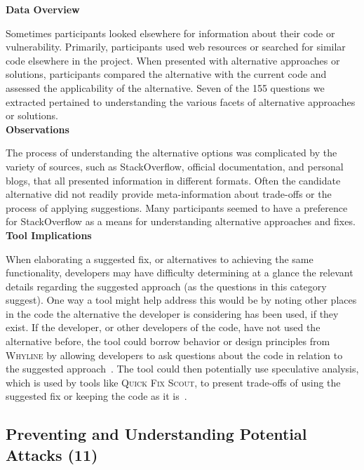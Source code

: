 \documentclass[conference]{IEEEtran}
\begin{document}
\noindent\textbf{Data Overview}

Sometimes participants looked elsewhere for information about their code or vulnerability. 
Primarily, participants used web resources or searched for similar code elsewhere in the project.
When presented with alternative approaches or solutions, participants compared the alternative with the current code and assessed the applicability of the alternative. 
Seven of the 155 questions we extracted pertained to understanding the various facets of alternative approaches or solutions.
\\

\noindent\textbf{Observations}

The process of understanding the alternative options was complicated by the variety of sources, such as StackOverflow, official documentation, and personal blogs, that all presented information in different formats.  
Often the candidate alternative did not readily provide meta-information about trade-offs or the process of applying suggestions. 
Many participants seemed to have a preference for StackOverflow as a means for understanding alternative approaches and fixes. 
\\

\noindent\textbf{Tool Implications}

When elaborating a suggested fix, or alternatives to achieving the same functionality, developers may have difficulty determining at a glance the relevant details regarding the suggested approach (as the questions in this category suggest).
One way a tool might help address this would be by noting other places in the code the alternative the developer is considering has been used, if they exist. 
If the developer, or other developers of the code, have not used the alternative before, the tool could borrow behavior or design principles from \textsc{Whyline} by allowing developers to ask questions about the code in relation to the suggested approach~\cite{ko2004designing}. 
The tool could then potentially use speculative analysis, which is used by tools like \textsc{Quick Fix Scout}, to present trade-offs of using the suggested fix or keeping the code as it is~\cite{mucslu2012speculative}.



\noindent\subsection{\textbf{Preventing and Understanding Potential Attacks (11)}}\label{pupa}
\end{document}
